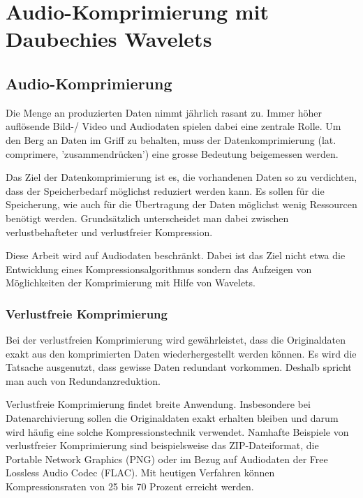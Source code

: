 %
%
%
\chapter{Audio-Komprimierung mit Daubechies Wavelets\label{chapter:compress}}
\begin{refsection}

\section{Audio-Komprimierung}
Die Menge an produzierten Daten nimmt jährlich rasant zu.
Immer höher auflösende Bild-/ Video und Audiodaten spielen dabei eine zentrale Rolle.
Um den Berg an Daten im Griff zu behalten, muss der Datenkomprimierung (lat. comprimere, 'zusammendrücken') eine grosse Bedeutung beigemessen werden. 

Das Ziel der Datenkomprimierung ist es, die vorhandenen Daten so zu verdichten, dass der Speicherbedarf möglichst reduziert werden kann.
Es sollen für die Speicherung, wie auch für die Übertragung der Daten möglichst wenig Ressourcen benötigt werden.
Grundsätzlich unterscheidet man dabei zwischen verlustbehafteter und verlustfreier Kompression.

Diese Arbeit wird auf Audiodaten beschränkt.
Dabei ist das Ziel nicht etwa die Entwicklung eines Kompressionsalgorithmus sondern das Aufzeigen von Möglichkeiten der Komprimierung mit Hilfe von Wavelets.

\subsection{Verlustfreie Komprimierung}
Bei der verlustfreien Komprimierung wird gewährleistet, dass die Originaldaten exakt aus den komprimierten Daten wiederhergestellt werden können.
Es wird die Tatsache ausgenutzt, dass gewisse Daten redundant vorkommen. 
Deshalb spricht man auch von Redundanzreduktion.

Verlustfreie Komprimierung findet breite Anwendung.
Insbesondere bei Datenarchivierung sollen die Originaldaten exakt erhalten bleiben und darum wird häufig eine solche Kompressionstechnik verwendet.
Namhafte Beispiele von verlustfreier Komprimierung sind beispielsweise das ZIP-Dateiformat, die Portable Network Graphics (PNG) oder im Bezug auf Audiodaten der Free Lossless Audio Codec (FLAC).
Mit heutigen Verfahren können Kompressionsraten von 25 bis 70 Prozent erreicht werden.


\end{refsection}
